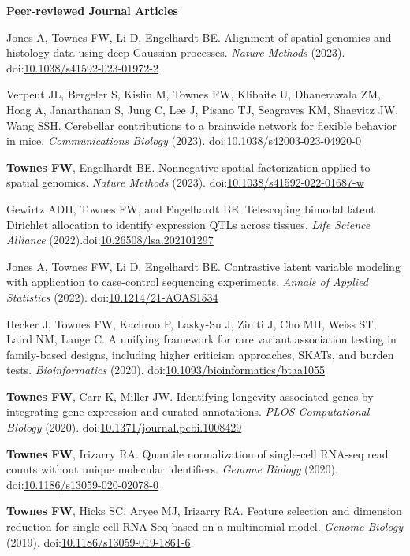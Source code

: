 \documentclass[10pt]{article}
\newcommand\doilink[1]{\href{https://dx.doi.org/#1}{#1}}
\newcommand\doi[1]{doi:\doilink{#1}}
\begin{document}
\textbf{Peer-reviewed Journal Articles}
\begin{enumerate}[label= {[\arabic*]}]
\item Jones A, Townes FW, Li D, Engelhardt BE. Alignment of spatial genomics and histology data using deep Gaussian processes. {\it Nature Methods} (2023). \doi{10.1038/s41592-023-01972-2}
\item Verpeut JL, Bergeler S, Kislin M, Townes FW, Klibaite U, Dhanerawala ZM, Hoag A, Janarthanan S, Jung C, Lee J, Pisano TJ, Seagraves KM, Shaevitz JW, Wang SSH. Cerebellar contributions to a brainwide network for flexible behavior in mice. {\it Communications Biology} (2023). \doi{10.1038/s42003-023-04920-0}
\item {\bf Townes FW}, Engelhardt BE. Nonnegative spatial factorization applied to spatial genomics. {\it Nature Methods} (2023). \doi{10.1038/s41592-022-01687-w}
\item Gewirtz ADH, Townes FW, and Engelhardt BE. Telescoping bimodal latent Dirichlet allocation to identify expression QTLs across tissues. {\it Life Science Alliance} (2022).\newline \doi{10.26508/lsa.202101297}
\item Jones A, Townes FW, Li D, Engelhardt BE. Contrastive latent variable modeling with application to case-control sequencing experiments. {\it Annals of Applied Statistics} (2022). \newline \doi{10.1214/21-AOAS1534}
\item Hecker J, Townes FW, Kachroo P, Lasky-Su J, Ziniti J, Cho MH, Weiss ST, Laird NM, Lange C. A unifying framework for rare variant association testing in family-based designs, including higher criticism approaches, SKATs, and burden tests. {\it Bioinformatics} (2020). \newline \doi{10.1093/bioinformatics/btaa1055}
\item {\bf Townes FW}, Carr K, Miller JW. Identifying longevity associated genes by integrating gene expression and curated annotations. {\it PLOS Computational Biology} (2020). \newline \doi{10.1371/journal.pcbi.1008429}
\item {\bf Townes FW}, Irizarry RA. Quantile normalization of single-cell RNA-seq read counts without unique molecular identifiers. {\it Genome Biology} (2020). \doi{10.1186/s13059-020-02078-0}
\item {\bf Townes FW}, Hicks SC, Aryee MJ, Irizarry RA. Feature selection and dimension reduction for single-cell RNA-Seq based on a multinomial model. {\it Genome Biology} (2019). \doi{10.1186/s13059-019-1861-6}.

\end{enumerate}
\end{document}
